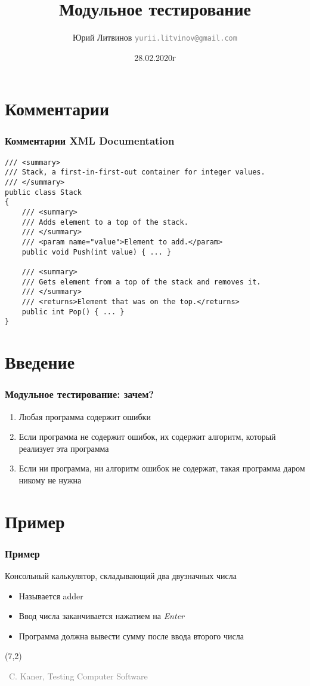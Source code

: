 \documentclass[xetex,mathserif,serif]{beamer}
\title{Модульное тестирование}
\author[Юрий Литвинов]{Юрий Литвинов \newline \textcolor{gray}{\small\texttt{yurii.litvinov@gmail.com}}}
\date{28.02.2020г}
\newcommand{\attribution}[1] {
	\begin{flushright}\begin{scriptsize}\textcolor{gray}{\textcopyright\, #1}\end{scriptsize}\end{flushright}
}
\begin{document}
	
	\frame{\titlepage}

	\section{Комментарии}

	\begin{frame}[fragile]
		\frametitle{Комментарии XML Documentation}
		\begin{small}
			\begin{verbatim}
/// <summary>
/// Stack, a first-in-first-out container for integer values.
/// </summary>
public class Stack
{
    /// <summary>
    /// Adds element to a top of the stack.
    /// </summary>
    /// <param name="value">Element to add.</param>
    public void Push(int value) { ... }

    /// <summary>
    /// Gets element from a top of the stack and removes it.
    /// </summary>
    /// <returns>Element that was on the top.</returns>
    public int Pop() { ... }
}
			\end{verbatim}
		\end{small}
	\end{frame}

	\section{Введение}

	\begin{frame}
		\frametitle{Модульное тестирование: зачем?}
		\begin{enumerate}
			\item Любая программа содержит ошибки
			\item Если программа не содержит ошибок, их содержит алгоритм, который реализует эта программа
			\item Если ни программа, ни алгоритм ошибок не содержат, такая программа даром никому не нужна
		\end{enumerate}
	\end{frame}

	\section{Пример}

	\begin{frame}
		\frametitle{Пример}
		Консольный калькулятор, складывающий два двузначных числа
		\begin{itemize}
			\item Называется adder
			\item Ввод числа заканчивается нажатием на \textit{Enter}
			\item Программа должна вывести сумму после ввода второго числа
		\end{itemize}
		\begin{textblock}{5}(7,2)
			\attribution{C. Kaner, Testing Computer Software}
		\end{textblock}
	\end{frame}
\end{document}
